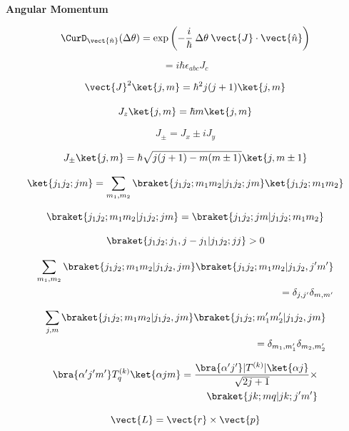 {\bf Angular Momentum}

\begin{equation}
\CurD_{\vect{\hat{n}}} (\Delta \theta )
  = \exp \left(-\frac{i}{\hbar} \: \Delta \theta \:
               \vect{J} \cdot \vect{\hat{n}} \right )
\end{equation}

\begin{equation}
[J_a,J_b] = i \hbar \epsilon_{abc} J_c
\end{equation}

\begin{equation}
\vect{J}^2 \ket{j,m} = \hbar^2 j (j+1) \ket{j,m}
\end{equation}

\begin{equation}
J_z \ket{j,m} = \hbar m \ket{j,m}
\end{equation}

\begin{equation}
J_{\pm} = J_x \pm i J_y
\end{equation}

\begin{equation}
J_{\pm} \ket{j,m} = \hbar \sqrt{j(j+1)-m(m\pm1)} \ket{j,m\pm1}
\end{equation}

\begin{equation}
\ket{j_1j_2;jm} =
 \sum_{m_1,m_2} \braket{j_1j_2;m_1m_2|j_1j_2;jm} \ket{j_1j_2;m_1m_2}
\end{equation}

\begin{equation}
\braket{j_1j_2;m_1m_2|j_1j_2;jm}
 = \braket{j_1j_2;jm|j_1j_2;m_1m_2}
\end{equation}

\begin{equation}
\braket{j_1j_2;j_1,j-j_1|j_1j_2;jj} > 0
\end{equation}

\begin{equation}
\begin{split}
\sum_{m_1,m_2} \braket{j_1j_2;m_1m_2|j_1j_2,jm} \braket{j_1j_2;m_1m_2|j_1j_2,j'm'} \\ = \delta_{j,j'}\delta_{m,m'}
\end{split}
\end{equation}

\begin{equation}
\begin{split}
\sum_{j,m} \braket{j_1j_2;m_1m_2|j_1j_2,jm} \braket{j_1j_2;m_1'm_2'|j_1j_2,jm} \\ = \delta_{m_1,m_1'}\delta_{m_2,m_2'}
\end{split}
\end{equation}

\begin{equation}
\begin{split}
\bra{\alpha' j' m'}T^{(k)}_q\ket{\alpha j m} =
  \frac{\bra{\alpha ' j'}|T^{(k)}|\ket{\alpha j}}{\sqrt{2j+1}} \times \\
  \braket{jk;mq|jk;j'm'}
\end{split}
\end{equation}

\begin{equation}
\vect{L} = \vect{r} \times \vect{p}
\end{equation}

